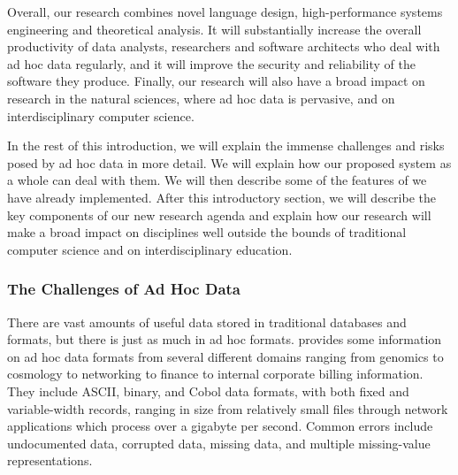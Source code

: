 \documentclass[11pt]{article}
\begin{document}
Overall, our research combines novel language design, high-performance
systems engineering and theoretical analysis.  It will substantially
increase the overall productivity of data analysts, researchers and
software architects who deal with ad hoc data regularly, and it will
improve the security and reliability of the software they produce.
Finally, our research will also have a broad impact on research in the
natural sciences, where ad hoc data is pervasive, and on
interdisciplinary computer science.

In the rest of this introduction, we will explain the immense
challenges and risks posed by ad hoc data in more detail.  We will
explain how our proposed system as a whole can deal with them.  We
will then describe some of the features of \pads{} we have already
implemented.  After this introductory section, we will describe the
key components of our new research agenda and explain how our research
will make a broad impact on disciplines well outside the bounds of
traditional computer science and on interdisciplinary education.

\subsubsection{The Challenges of Ad Hoc Data}

There are vast amounts of useful data stored in
traditional databases and \xml{} formats, but there is just as much in
ad hoc formats.   provides some information
on ad hoc data formats from several different domains ranging from genomics
to cosmology to networking to finance to internal corporate billing information.  
They include ASCII, binary, and Cobol data formats, with
both fixed and variable-width records, ranging in size from
relatively small files through network applications which process over
a gigabyte per second.  Common errors include undocumented data,
corrupted data, missing data, and multiple missing-value
representations.
\end{document}
